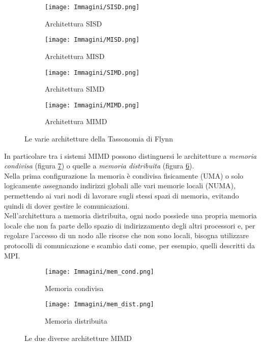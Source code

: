 \begin{figure}[H]
	\centering
	\begin{subfigure}{.5\textwidth}
		\centering
		\texttt{[image: Immagini/SISD.png]}
		\caption{Architettura SISD\newline}
		\label{fig:sisd}
	\end{subfigure}%
	\begin{subfigure}{.5\textwidth}
		\centering
		\texttt{[image: Immagini/MISD.png]}
		\caption{Architettura MISD\newline}
		\label{fig:misd}
	\end{subfigure}
	\label{fig:test}
	\begin{subfigure}{.5\textwidth}
		\centering
		\texttt{[image: Immagini/SIMD.png]}
		\caption{Architettura SIMD\newline}
		\label{fig:simd}
	\end{subfigure}%
	\begin{subfigure}{.5\textwidth}
		\centering
		\texttt{[image: Immagini/MIMD.png]}
		\caption{Architettura MIMD\newline}
		\label{fig:mimd}
	\end{subfigure}
	\caption{Le varie architetture della Tassonomia di Flynn}
\end{figure}

In particolare tra i sistemi MIMD possono distinguersi le architetture a \emph{memoria condivisa} (figura \ref{fig:mem_dist}) o quelle a \emph{memoria distribuita} (figura \ref{fig:mem_cond}).\\
Nella prima configurazione la memoria è condivisa fisicamente (UMA) o solo logicamente assegnando indirizzi globali alle vari memorie locali (NUMA), permettendo ai vari nodi di lavorare sugli stessi spazi di memoria, evitando quindi di dover gestire le comunicazioni.\\
Nell'architettura a memoria distribuita, ogni nodo possiede una propria memoria locale che non fa parte dello spazio di indirizzamento degli altri processori e, per regolare l'accesso di un nodo alle risorse che non sono locali, bisogna utilizzare protocolli di comunicazione e scambio dati come, per esempio, quelli descritti da MPI.
\begin{figure}[H]
	\centering
	\begin{subfigure}{0.5\textwidth}
		\centering
		\texttt{[image: Immagini/mem\_cond.png]}
		\caption{Memoria condivisa}
		\label{fig:mem_cond}
	\end{subfigure}%
	\begin{subfigure}{0.5\textwidth}
		\centering
		\texttt{[image: Immagini/mem\_dist.png]}
		\caption{Memoria distribuita}
		\label{fig:mem_dist}
	\end{subfigure}
	\label{fig:mem_cond_dist}
	\caption{Le due diverse architetture MIMD}
\end{figure}
